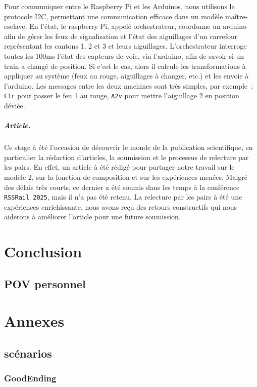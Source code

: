 \documentclass[oneside, a4paper, 11pt]{book}
\begin{document}

Pour communiquer entre le Raspberry Pi et les Arduinos, nous utilisons le protocole I2C, permettant une communication efficace dans un modèle maître-esclave.
En l'état, le raspberry Pi, appelé orchestrateur, coordonne un arduino afin de gérer les feux de signalisation et l'état des aiguillages d'un carrefour représentant les cantons 1, 2 et 3 et leurs aiguillages.
L'orchestrateur interroge toutes les 100ms l'état des capteurs de voie, via l'arduino, afin de savoir si un train a changé de position. Si c'est le cas, alors il calcule les transformations à appliquer au système (feux au rouge, aiguillages à changer, etc.) et les envoie à l'arduino.
Les messages entre les deux machines sont très simples, par exemple~: \texttt{F1r} pour passer le feu 1 au rouge, \texttt{A2v} pour mettre l'aiguillage 2 en position déviée.


\paragraph{Article.}
Ce stage à été l'occasion de découvrir le monde de la publication scientifique, en particulier la rédaction d'articles, la soumission et le processus de relecture par les pairs. 
En effet, un article à été rédigé pour partager notre travail sur le modèle 2, sur la fonction de composition et sur les expériences menées. Malgré des délais très courts, ce dernier a été soumis dans les temps à la conférence \texttt{RSSRail 2025}, mais il n'a pas été retenu.
La relecture par les pairs à été une expériences enrichissante, nous avons reçu des retours constructifs qui nous aiderons à améliorer l'article pour une future soumission.








\chapter{Conclusion}

\section{POV personnel}

\appendix

\chapter{Annexes}
\section{scénarios}
\subsection{GoodEnding}
\label{scenar:goodEnding}

\backmatter
%
%
\printindex
\end{document}
